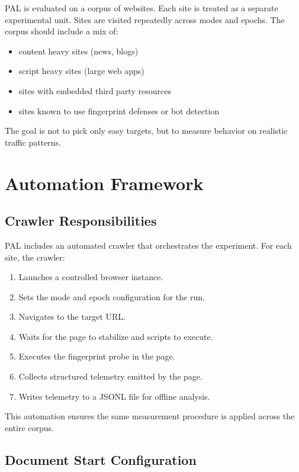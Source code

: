 \documentclass[11pt]{report}
\begin{document}
PAL is evaluated on a corpus of websites. Each site is treated as a separate experimental unit. Sites are visited repeatedly across modes and epochs. The corpus should include a mix of:

\begin{itemize}
    \item content heavy sites (news, blogs)
    \item script heavy sites (large web apps)
    \item sites with embedded third party resources
    \item sites known to use fingerprint defenses or bot detection
\end{itemize}

The goal is not to pick only easy targets, but to measure behavior on realistic traffic patterns.

\section{Automation Framework}

\subsection{Crawler Responsibilities}

PAL includes an automated crawler that orchestrates the experiment. For each site, the crawler:

\begin{enumerate}
    \item Launches a controlled browser instance.
    \item Sets the mode and epoch configuration for the run.
    \item Navigates to the target URL.
    \item Waits for the page to stabilize and scripts to execute.
    \item Executes the fingerprint probe in the page.
    \item Collects structured telemetry emitted by the page.
    \item Writes telemetry to a JSONL file for offline analysis.
\end{enumerate}

This automation ensures the same measurement procedure is applied across the entire corpus.

\subsection{Document Start Configuration}
\end{document}
